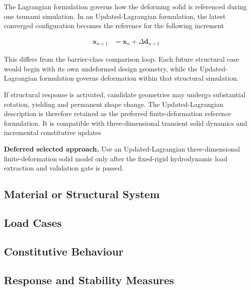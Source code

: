 The Lagrangian formulation governs how the deforming solid is referenced during one tsunami simulation. In an Updated-Lagrangian formulation, the latest converged configuration becomes the reference for the following increment

\begin{align}
\bm{x}_{n+1}
&=
\bm{x}_{n}
+
\Delta\bm{d}_{n+1}
\label{eq:res_str_rsp_updated_lagrangian_position}
\end{align}

This differs from the barrier-class comparison loop. Each future
structural case would begin with its own undeformed design geometry,
while the Updated-Lagrangian formulation governs deformation within
that structural simulation.

If structural response is activated, candidate geometries may undergo
substantial rotation, yielding and permanent shape change. The
Updated-Lagrangian description is therefore retained as the preferred
finite-deformation reference formulation. It is compatible with
three-dimensional transient solid dynamics and incremental
constitutive updates \autocite{nemer2021}

\textbf{Deferred selected approach.} Use an Updated-Lagrangian
three-dimensional finite-deformation solid model only after the
fixed-rigid hydrodynamic load extraction and validation gate is passed.

\subsection{Material or Structural System}
\label{sec:res-str-rsp-material-structural-system}


\subsection{Load Cases}
\label{sec:res-str-rsp-load-cases}


\subsection{Constitutive Behaviour}
\label{sec:res-str-rsp-constitutive-behaviour}


\subsection{Response and Stability Measures}
\label{sec:res-str-rsp-response-stability-measures}

